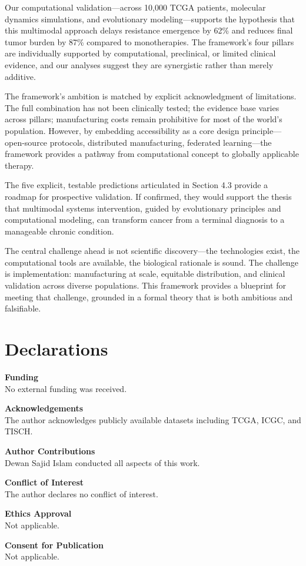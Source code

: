 \documentclass[12pt,a4paper]{article}
\begin{document}
Our computational validation—across 10,000 TCGA patients, molecular dynamics simulations, and evolutionary modeling—supports the hypothesis that this multimodal approach delays resistance emergence by 62\% and reduces final tumor burden by 87\% compared to monotherapies. The framework's four pillars are individually supported by computational, preclinical, or limited clinical evidence, and our analyses suggest they are synergistic rather than merely additive.

The framework's ambition is matched by explicit acknowledgment of limitations. The full combination has not been clinically tested; the evidence base varies across pillars; manufacturing costs remain prohibitive for most of the world's population. However, by embedding accessibility as a core design principle—open-source protocols, distributed manufacturing, federated learning—the framework provides a pathway from computational concept to globally applicable therapy.

The five explicit, testable predictions articulated in Section 4.3 provide a roadmap for prospective validation. If confirmed, they would support the thesis that multimodal systems intervention, guided by evolutionary principles and computational modeling, can transform cancer from a terminal diagnosis to a manageable chronic condition.

The central challenge ahead is not scientific discovery—the technologies exist, the computational tools are available, the biological rationale is sound. The challenge is implementation: manufacturing at scale, equitable distribution, and clinical validation across diverse populations. This framework provides a blueprint for meeting that challenge, grounded in a formal theory that is both ambitious and falsifiable.

\section*{Declarations}

\textbf{Funding} \\
No external funding was received.

\textbf{Acknowledgements} \\
The author acknowledges publicly available datasets including TCGA, ICGC, and TISCH.

\textbf{Author Contributions} \\
Dewan Sajid Islam conducted all aspects of this work.

\textbf{Conflict of Interest} \\
The author declares no conflict of interest.

\textbf{Ethics Approval} \\
Not applicable.

\textbf{Consent for Publication} \\
Not applicable.



\end{document}
